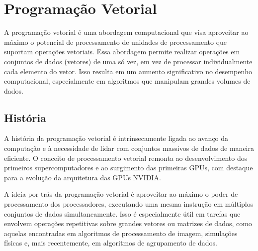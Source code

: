 \documentclass[12pt, %
openright, 
oneside, %
a4paper,    %
brazil]{facom-ufu-abntex2}
\begin{document}

\section{Programação Vetorial}




A programação vetorial é uma abordagem computacional que visa aproveitar ao máximo o potencial de processamento de unidades de processamento que suportam operações vetoriais. Essa abordagem permite realizar operações em conjuntos de dados (vetores) de uma só vez, em vez de processar individualmente cada elemento do vetor. Isso resulta em um aumento significativo no desempenho computacional, especialmente em algoritmos que manipulam grandes volumes de dados.



\subsection{História}

A história da programação vetorial é intrinsecamente ligada ao avanço da computação e à necessidade de lidar com conjuntos massivos de dados de maneira eficiente. O conceito de processamento vetorial remonta ao desenvolvimento dos primeiros supercomputadores e ao surgimento das primeiras GPUs, com destaque para a evolução da arquitetura das GPUs NVIDIA.

A ideia por trás da programação vetorial é aproveitar ao máximo o poder de processamento dos processadores, executando uma mesma instrução em múltiplos conjuntos de dados simultaneamente. Isso é especialmente útil em tarefas que envolvem operações repetitivas sobre grandes vetores ou matrizes de dados, como aquelas encontradas em algoritmos de processamento de imagem, simulações físicas e, mais recentemente, em algoritmos de agrupamento de dados.
\end{document}
